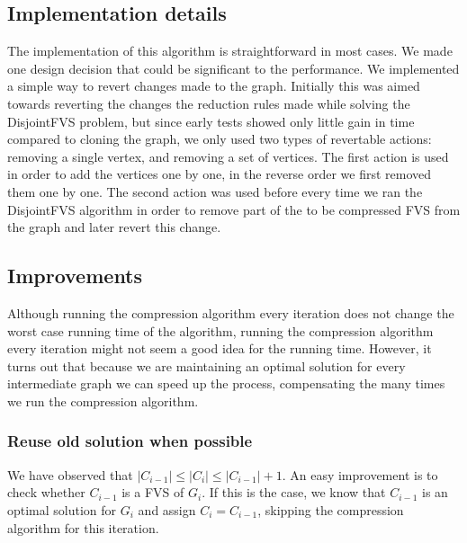 \subsection{Implementation details}
The implementation of this algorithm is straightforward in most cases. We made one design decision that could be
significant to the performance. We implemented a simple way to revert changes made to the graph. Initially this was aimed
towards reverting the changes the reduction rules made while solving the {\sc DisjointFVS} problem, but since early tests
showed only little gain in time compared to cloning the graph, we only used two types of revertable actions: removing a
single vertex, and removing a set of vertices. The first action is used in order to add the vertices one by one, in the
reverse order we first removed them one by one. The second action was used before every time we ran the {\sc DisjointFVS}
algorithm in order to remove part of the to be compressed FVS from the graph and later revert this change.

\subsection{Improvements}
Although running the compression algorithm every iteration does not change the worst case
running time of the algorithm, running the compression algorithm every iteration might not seem a good idea for the
running time. However, it turns out that because we are maintaining an optimal solution for every intermediate graph we
can speed up the process, compensating the many times we run the compression algorithm.

\subsubsection{Reuse old solution when possible}
We have observed that $|C_{i-1}| \leq |C_i| \leq |C_{i-1}|+1$. An easy
improvement is to check whether $C_{i-1}$ is a FVS of $G_i$. If this is the case, we know that $C_{i-1}$ is an optimal
solution for $G_i$ and assign $C_i = C_{i-1}$, skipping the compression algorithm for this iteration.

